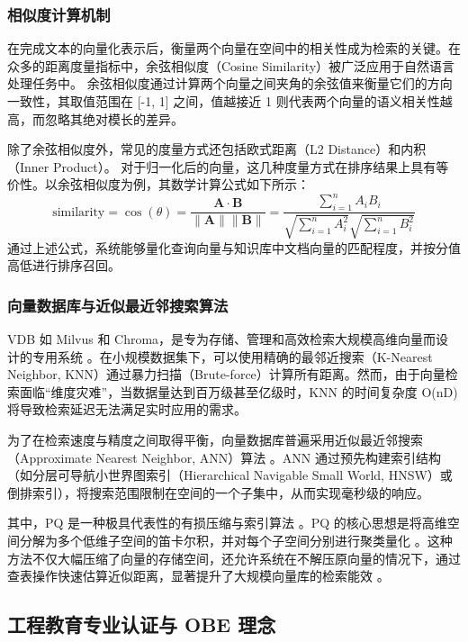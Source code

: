 \documentclass[UTF8,a4paper,zihao=-4]{ctexart}
\begin{document}
\subsubsection{相似度计算机制}
在完成文本的向量化表示后，衡量两个向量在空间中的相关性成为检索的关键。在众多的距离度量指标中，余弦相似度（Cosine Similarity）被广泛应用于自然语言处理任务中\cite{taipalus_vector_2024}。
余弦相似度通过计算两个向量之间夹角的余弦值来衡量它们的方向一致性，其取值范围在 [-1, 1] 之间，值越接近 1 则代表两个向量的语义相关性越高，而忽略其绝对模长的差异。

除了余弦相似度外，常见的度量方式还包括欧式距离（L2 Distance）和内积（Inner Product）\cite{taipalus_vector_2024,ma_comprehensive_2025}。
对于归一化后的向量，这几种度量方式在排序结果上具有等价性。以余弦相似度为例，其数学计算公式如下所示：
\begin{equation}
    \text{similarity} = \cos(\theta) = \frac{\mathbf{A} \cdot \mathbf{B}}{\|\mathbf{A}\| \|\mathbf{B}\|} = \frac{\sum_{i=1}^{n} A_i B_i}{\sqrt{\sum_{i=1}^{n} A_i^2} \sqrt{\sum_{i=1}^{n} B_i^2}}
\end{equation}
通过上述公式，系统能够量化查询向量与知识库中文档向量的匹配程度，并按分值高低进行排序召回\cite{sys_rag}。

\subsubsection{向量数据库与近似最近邻搜索算法}
VDB 如 Milvus 和 Chroma，是专为存储、管理和高效检索大规模高维向量而设计的专用系统\cite{ma_comprehensive_2025}
。在小规模数据集下，可以使用精确的最邻近搜索（K-Nearest Neighbor, KNN）通过暴力扫描（Brute-force）计算所有距离。然而，由于向量检索面临“维度灾难”，当数据量达到百万级甚至亿级时，KNN 的时间复杂度 O(nD) 将导致检索延迟无法满足实时应用的需求\cite{jegou_product_2011}。

为了在检索速度与精度之间取得平衡，向量数据库普遍采用近似最近邻搜索（Approximate Nearest Neighbor, ANN）算法\cite{jegou_product_2011}
。ANN 通过预先构建索引结构（如分层可导航小世界图索引（Hierarchical Navigable Small World, HNSW）或倒排索引），将搜索范围限制在空间的一个子集中，从而实现毫秒级的响应。

其中，PQ 是一种极具代表性的有损压缩与索引算法\cite{jegou_product_2011}
。PQ 的核心思想是将高维空间分解为多个低维子空间的笛卡尔积，并对每个子空间分别进行聚类量化
。这种方法不仅大幅压缩了向量的存储空间，还允许系统在不解压原向量的情况下，通过查表操作快速估算近似距离，显著提升了大规模向量库的检索能效\cite{ma_comprehensive_2025}
。
\subsection{工程教育专业认证与 OBE 理念}
\end{document}
